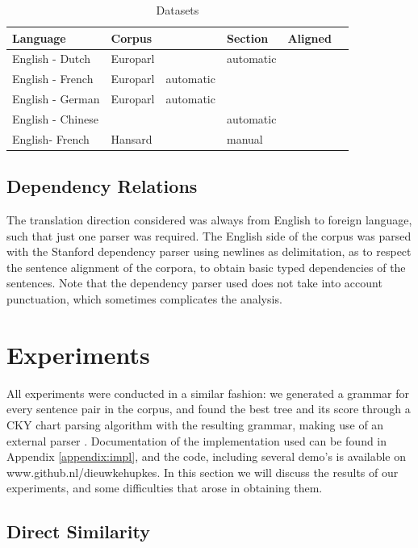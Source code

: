\documentclass{report}
\theoremstyle{break}
\begin{document}
\begin{table}
\begin{tabular}{llllll}
Language & Corpus & & Section & Aligned\\
\hline
English - Dutch & Europarl & & automatic \\
English - French & Europarl & automatic \\
English - German & Europarl & automatic \\
English - Chinese & & & automatic \\
English- French & Hansard & & manual\\
\end{tabular}
\caption{Datasets}\label{tab:datasets}
\end{table}

\subsection{Dependency Relations}

The translation direction considered was always from English to foreign language, such that just one parser was required. The English side of the corpus was parsed with the Stanford dependency parser \citep{de2008stanford} using newlines as delimitation, as to respect the sentence alignment of the corpora, to obtain basic typed dependencies of the sentences. Note that the dependency parser used does not take into account punctuation, which sometimes complicates the analysis.


\section{Experiments}

All experiments were conducted in a similar fashion: we generated a grammar for every sentence pair in the corpus, and found the best tree and its score through a CKY chart parsing algorithm with the resulting grammar, making use of an external parser \citep{birch2010lrscore}. Documentation of the implementation used can be found in Appendix \ref{appendix:impl}, and the code, including several demo's is available on www.github.nl/dieuwkehupkes. In this section we will discuss the results of our experiments, and some difficulties that arose in obtaining them.


\subsection{Direct Similarity}
\end{document}
